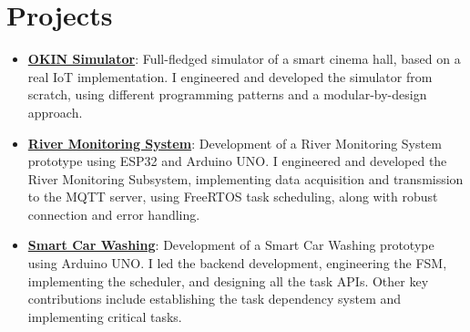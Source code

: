 \documentclass[letterpaper,11pt]{article}
\newcommand{\resumeItem}[2]{
  \item\small{
    \textbf{#1}{: #2 \vspace{-2pt}}
  }
}
\newcommand{\resumeSubItem}[2]{\resumeItem{#1}{#2}\vspace{-4pt}}
\newcommand{\resumeSubHeadingListStart}{\begin{itemize}[leftmargin=*]}
\newcommand{\resumeSubHeadingListEnd}{\end{itemize}}
\begin{document}
\section{Projects}
  \resumeSubHeadingListStart
  \resumeSubItem{\href{https://github.com/aleemont1/OKINsimulator}{OKIN Simulator}}
      {Full-fledged simulator of a smart cinema hall, based on a real IoT implementation.
       I engineered and developed the simulator from scratch, using different programming patterns and a modular-by-design approach.}
    \resumeSubItem{\href{https://github.com/aleemont1/esiot-23-24-assignment3/}{River Monitoring System}}
      {Development of a River Monitoring System prototype using ESP32 and Arduino UNO.
       I engineered and developed the River Monitoring Subsystem, implementing data acquisition and
       transmission to the MQTT server, using FreeRTOS task scheduling, along with robust connection and error handling.}
    \resumeSubItem{\href{https://github.com/aleemont1/esiot-23-24-assignment2/}{Smart Car Washing}}
      {Development of a Smart Car Washing prototype using Arduino UNO. 
      I led the backend development, engineering the FSM, implementing the scheduler, and designing all the task APIs. 
      Other key contributions include establishing the task dependency system and implementing critical tasks.}
  \resumeSubHeadingListEnd
\end{document}
